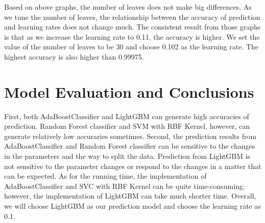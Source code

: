 \documentclass[12pt]{article}
\begin{document}
\begin{figure}[H]
\centering
{}
\end{figure}
Based on above graphs, the number of leaves does not make big differences. As we tune the number of leaves, the relationship between the accuracy of prediction and learning rates does not change much. The consistent result from those graphs is that as we increase the learning rate to 0.11, the accuracy is higher. We set the value of the number of leaves to be 30 and choose 0.102 as the learning rate. The highest accuracy is also higher than 0.99975.

\section{Model Evaluation and Conclusions}
First, both AdaBoostClassifier and LightGBM can generate high accuracies of prediction. Random Forest classifier and SVM with RBF Kernel, however, can generate relatively low accuraries sometimes. Second, the prediction results from AdaBoostClassifier and Random Forest classifier can be sensitive to the changes in the parameters and the way to split the data. Prediction from LightGBM is not sensitive to the parameter changes or respond to the changes in a matter that can be expected. As for the running time, the implementation of AdaBoostClassifier and SVC with RBF Kernel can be quite time-consuming; however, the implementation of LightGBM can take much shorter time. Overall, we will choose LightGBM as our prediction model and choose the learning rate as 0.1.
 
 
\end{document}
